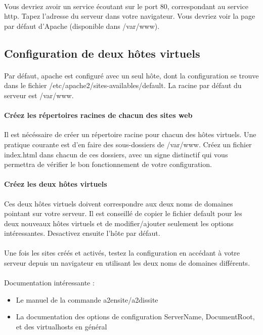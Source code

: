 \documentclass[12pt,a4paper]{article}
\begin{document}
\paragraph{}
Vous devriez avoir un service écoutant sur le port 80, correspondant au service http. Tapez l'adresse du serveur dans votre navigateur. Vous devriez voir la page par défaut d'Apache (disponible dans /var/www).

\subsection{Configuration de deux hôtes virtuels}
\paragraph{}
Par défaut, apache est configuré avec un seul hôte, dont la configuration se trouve dans le fichier /etc/apache2/sites-availables/default. La racine par défaut du serveur est /var/www.

\paragraph{Créez les répertoires racines de chacun des sites web\\}
Il est nécéssaire de créer un répertoire racine pour chacun des hôtes virtuels. Une pratique courante est d'en faire des sous-dossiers de /var/www. Créez un fichier index.html dans chacun de ces dossiers, avec un signe distinctif qui vous permettra de vérifier le bon fonctionnement de votre configuration.

\paragraph{Créez les deux hôtes virtuels\\}
Ces deux hôtes virtuels doivent correspondre aux deux noms de domaines pointant sur votre serveur. Il est conseillé de copier le fichier default pour les deux nouveaux hôtes virtuels et de modifier/ajouter seulement les options intéressantes. Desactivez ensuite l'hôte par défaut.

\paragraph{}
Une fois les sites créés et activés, testez la configuration en accédant à votre serveur depuis un navigateur en utilisant les deux noms de domaines différents.

\paragraph{}
Documentation intéressante : 
\begin{itemize}
\item Le manuel de la commande a2ensite/a2dissite
\item La documentation des options de configuration ServerName, DocumentRoot, et des virtualhosts en général
\end{itemize}
\end{document}
